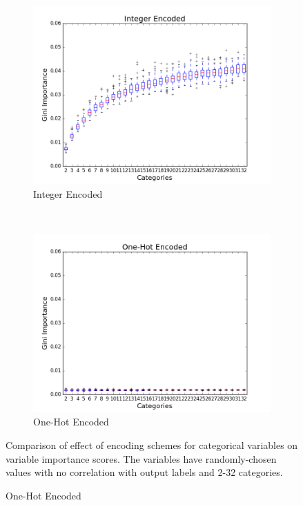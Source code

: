 \begin{figure}[H]
  \centering
  \caption{ENCODING SCHEME VARIABLE IMPORTANCE SCORES}
  \begin{subfigure}[b]{0.45\textwidth}
    \includegraphics[width=\textwidth]{figures/random_forests/rf_bias_integer}
    \caption{Integer Encoded}
    \label{fig:integer}
  \end{subfigure}
  ~
  \begin{subfigure}[b]{0.45\textwidth}
    \includegraphics[width=\textwidth]{figures/random_forests/rf_bias_onehot}
    \caption{One-Hot Encoded}
    \label{fig:one-hot}
  \end{subfigure}

  Comparison of effect of encoding schemes for categorical variables on variable importance scores. The variables have randomly-chosen values with no correlation with output labels and 2-32 categories.
  \label{fig:encoding-schemes}
\end{figure}

